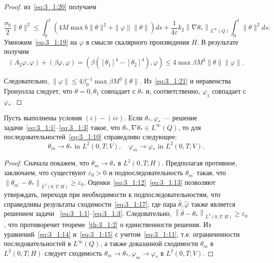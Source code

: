 \begin{proof}
    из~\eqref{eq:3_1:20} получаем

    \begin{equation}
        \label{eq:3_1:21}
        \frac{\sigma_{0}}{2}\|\theta\|^{2} \leq \int_{0}^{t}
        \left(4 M \max b\|\theta\|^{2}+\|\varphi\|\|\theta\|\right) d s
        +\frac{1}{4 \varepsilon} k_{2}\left\|\nabla \theta_{*}\right\|_{L^{\infty}(Q)}
        \int_{0}^{t}\|\theta\|^{2} d s.
    \end{equation}
Умножим~\eqref{eq:3_1:19} на $\varphi$ в смысле скалярного произведения $H$.
В результате получим
    \[
        \left(A_{2} \varphi, \varphi\right)+(\beta \varphi, \varphi)=
        \left(\beta\left(\left[\theta_{1}\right]^{4}-
        \left[\theta_{2}\right]^{4}\right), \varphi\right)
        \leq 4 \max \beta M^{3}\|\theta\|\|\varphi\|.
    \]


    Следовательно, $\|\varphi\| \leq 4 \beta_{0}^{-1} \max \beta M^{3}\|\theta\|$.
    Из~\eqref{eq:3_1:21} и неравенства Гронуолла следует, что $\theta=0, \theta_{1}$
    совпадает с $\theta_{*}$ и, соответственно, $\varphi_{1}$ совпадает с $\varphi_{*}$.
\end{proof}

\begin{theorem}
    \label{th:3_1:3}
    Пусть выполнены условия $(i)-(iv)$.
    Если $\theta_{*}, \varphi_{*}$ — решение задачи~\eqref{eq:3_1:1}--\eqref{eq:3_1:3}
    такое, что $\theta_{*}, \nabla \theta_{*} \in L^{\infty }(Q)$,
    то для последовательностей~\eqref{eq:3_1:10} справедливо следующее:
    \[
        \theta_{m} \rightarrow \theta_{*} \text { in } L^{2}(0, T ; V),
        \quad \varphi_{m} \rightarrow \varphi_{*} \text { in } L^{2}(0, T ; V).
    \]
\end{theorem}

\begin{proof}

    Сначала покажем, что $\theta_{m} \rightarrow \theta_{*}$ в $L^{2}(0, T ; H)$.
    Предполагая противное, заключаем, что существуют $\varepsilon_{0}>0$
    и подпоследовательность $\theta_{m^{\prime}}$ такая, что
    $\left\|\theta_{m^{\prime}} -\theta_{*}\right\|_{L^{2}(0, T ; H)}
    \geq \varepsilon_{0}$.
    Оценки~\eqref{eq:3_1:12}~\eqref{eq:3_1:13} позволяют утверждать,
    переходя при необходимости к подпоследовательностям,
    что справедливы результаты сходимости~\eqref{eq:3_1:17},
    где пара $\widehat{\theta}, \widehat{\varphi}$
    также является решением задачи ~\eqref{eq:3_1:1}--\eqref{eq:3_1:3}.
    Следовательно, $\left\|\widehat{\theta}-\theta_{*}\right\|_{L^{2}(0, T ; H)}
    \geq \varepsilon_{0}$, что противоречит теореме~\ref{th:3_1:2} о единственности решения.
    Из уравнений~\eqref{eq:3_1:14} и~\eqref{eq:3_1:15} с учетом~\eqref{eq:3_1:11},
    т.е. ограниченности последовательностей в $L^{\infty}(Q)$,
    а также доказанной сходимости $\theta_{m}$ в $L^{2}(0, T; H)$
    следует сходимость $\theta_{m} \rightarrow \theta_{*}, \varphi_{m}
    \rightarrow \varphi_{*}$ в $L^ {2}(0, T; V)$.
\end{proof}
